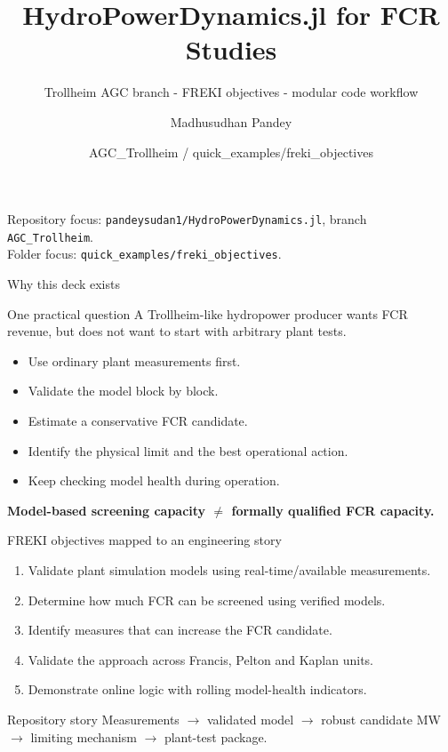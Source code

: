\documentclass[aspectratio=169,11pt]{beamer}
\title[HPD.jl FCR/FREKI]{HydroPowerDynamics.jl for FCR Studies}
\subtitle{Trollheim AGC branch - FREKI objectives - modular code workflow}
\author{Madhusudhan Pandey}
\date{AGC\_Trollheim / quick\_examples/freki\_objectives}
\begin{document}
\begin{frame}
  \titlepage
  \vfill
  \small Repository focus: \texttt{pandeysudan1/HydroPowerDynamics.jl}, branch \texttt{AGC\_Trollheim}.\\
  Folder focus: \texttt{quick\_examples/freki\_objectives}.
\end{frame}

\begin{frame}{Why this deck exists}
\begin{block}{One practical question}
A Trollheim-like hydropower producer wants FCR revenue, but does not want to start with arbitrary plant tests.
\end{block}
\begin{itemize}
\item Use ordinary plant measurements first.
\item Validate the model block by block.
\item Estimate a conservative FCR candidate.
\item Identify the physical limit and the best operational action.
\item Keep checking model health during operation.
\end{itemize}
\vspace{0.2cm}
\centering
\textbf{Model-based screening capacity $\neq$ formally qualified FCR capacity.}
\end{frame}

\begin{frame}{FREKI objectives mapped to an engineering story}
\begin{enumerate}
\item Validate plant simulation models using real-time/available measurements.
\item Determine how much FCR can be screened using verified models.
\item Identify measures that can increase the FCR candidate.
\item Validate the approach across Francis, Pelton and Kaplan units.
\item Demonstrate online logic with rolling model-health indicators.
\end{enumerate}
\vspace{0.25cm}
\begin{block}{Repository story}
Measurements $\rightarrow$ validated model $\rightarrow$ robust candidate MW $\rightarrow$ limiting mechanism $\rightarrow$ plant-test package.
\end{block}
\end{frame}
\end{document}
